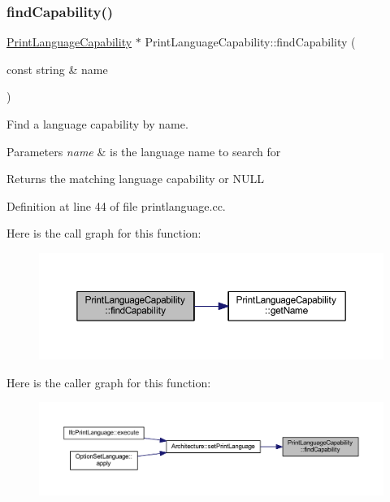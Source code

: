 \subsubsection{\texorpdfstring{findCapability()}{findCapability()}}
{\footnotesize\ttfamily \mbox{\hyperlink{class_print_language_capability}{Print\+Language\+Capability}} $\ast$ Print\+Language\+Capability\+::find\+Capability (\begin{DoxyParamCaption}\item[{const string \&}]{name }\end{DoxyParamCaption})\hspace{0.3cm}{\ttfamily [static]}}



Find a language capability by name. 


\begin{DoxyParams}{Parameters}
{\em name} & is the language name to search for \\
\hline
\end{DoxyParams}
\begin{DoxyReturn}{Returns}
the matching language capability or N\+U\+LL 
\end{DoxyReturn}


Definition at line 44 of file printlanguage.\+cc.

Here is the call graph for this function\+:
\nopagebreak
\begin{figure}[H]
\begin{center}
\leavevmode
\includegraphics[width=350pt]{class_print_language_capability_a5feea559122bb1d976707540eb4b32ff_cgraph}
\end{center}
\end{figure}
Here is the caller graph for this function\+:
\nopagebreak
\begin{figure}[H]
\begin{center}
\leavevmode
\includegraphics[width=350pt]{class_print_language_capability_a5feea559122bb1d976707540eb4b32ff_icgraph}
\end{center}
\end{figure}
\mbox{\label{class_print_language_capability_a2902f4f1ca2e24f215dcd431dbedc310}} 
